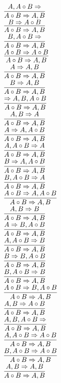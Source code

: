\documentclass[11pt]{article}
\begin{document}
\begin{center}
\bigskip
\\$\infer{A\circ B\Rightarrow A, B}{A, A\circ B\Rightarrow }$
\bigskip
\\$\infer{A\circ B\Rightarrow A, B}{B\Rightarrow A\circ B}$
\bigskip
\\$\infer{A\circ B\Rightarrow A, B}{B, A\circ B\Rightarrow }$
\bigskip
\\$\infer{A\circ B\Rightarrow A, B}{A\circ B\Rightarrow A\circ B}$
\bigskip
\\$\infer{A\circ B\Rightarrow A, B}{A\Rightarrow A, B}$
\bigskip
\\$\infer{A\circ B\Rightarrow A, B}{B\Rightarrow A, B}$
\bigskip
\\$\infer{A\circ B\Rightarrow A, B}{\Rightarrow A, B, A\circ B}$
\bigskip
\\$\infer{A\circ B\Rightarrow A, B}{A, B\Rightarrow A}$
\bigskip
\\$\infer{A\circ B\Rightarrow A, B}{A\Rightarrow A, A\circ B}$
\bigskip
\\$\infer{A\circ B\Rightarrow A, B}{A, A\circ B\Rightarrow A}$
\bigskip
\\$\infer{A\circ B\Rightarrow A, B}{B\Rightarrow A, A\circ B}$
\bigskip
\\$\infer{A\circ B\Rightarrow A, B}{B, A\circ B\Rightarrow A}$
\bigskip
\\$\infer{A\circ B\Rightarrow A, B}{A\circ B\Rightarrow A, A\circ B}$
\bigskip
\\$\infer{A\circ B\Rightarrow A, B}{A, B\Rightarrow B}$
\bigskip
\\$\infer{A\circ B\Rightarrow A, B}{A\Rightarrow B, A\circ B}$
\bigskip
\\$\infer{A\circ B\Rightarrow A, B}{A, A\circ B\Rightarrow B}$
\bigskip
\\$\infer{A\circ B\Rightarrow A, B}{B\Rightarrow B, A\circ B}$
\bigskip
\\$\infer{A\circ B\Rightarrow A, B}{B, A\circ B\Rightarrow B}$
\bigskip
\\$\infer{A\circ B\Rightarrow A, B}{A\circ B\Rightarrow B, A\circ B}$
\bigskip
\\$\infer{A\circ B\Rightarrow A, B}{A, B\Rightarrow A\circ B}$
\bigskip
\\$\infer{A\circ B\Rightarrow A, B}{A, B, A\circ B\Rightarrow }$
\bigskip
\\$\infer{A\circ B\Rightarrow A, B}{A, A\circ B\Rightarrow A\circ B}$
\bigskip
\\$\infer{A\circ B\Rightarrow A, B}{B, A\circ B\Rightarrow A\circ B}$
\bigskip
\\$\infer{A\circ B\Rightarrow A, B}{A, B\Rightarrow A, B}$

\end{center}
\end{document}
